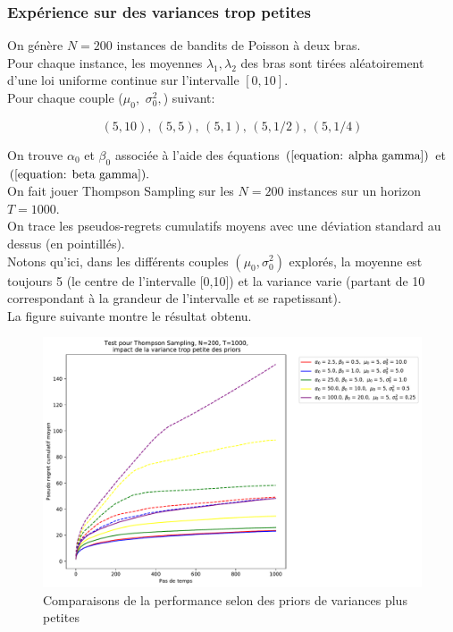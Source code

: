 \documentclass[letterpaper,11pt]{article}
\begin{document}
\subsubsection*{Expérience sur des variances trop petites}

On génère $N=200$ instances de bandits de Poisson à deux bras.\\
Pour chaque instance, les moyennes $\lambda_1, \lambda_2$ des bras sont tirées aléatoirement d'une loi uniforme continue sur l'intervalle $[0,10]$.\\

Pour chaque couple ($\mu_0,$ $\sigma^2_0,$) suivant:

$$(5,10),\,(5,5),\,(5,1),\,(5,1/2),\,(5,1/4)$$

On trouve $\alpha_0$ et $\beta_0$ associée à l'aide des équations $(\ref{equation: alpha gamma})$ et $(\ref{equation: beta gamma}).$
\\

On fait jouer Thompson Sampling sur les $N=200$ instances sur un horizon $T=1000.$\\
 
On trace les pseudos-regrets cumulatifs moyens avec une déviation standard au dessus (en pointillés).\\

Notons qu'ici, dans les différents couples $(\mu_0,\sigma^2_0)$ explorés, la moyenne est toujours 5 (le centre de l'intervalle [0,10]) et la variance varie (partant de 10 correspondant à la grandeur de l'intervalle et se rapetissant).\\

La figure suivante montre le résultat obtenu.

\begin{figure}[H]
\label{figure: variance petite}
\caption{Comparaisons de la performance selon des priors de variances plus petites}
\begin{center}
\includegraphics[scale=0.5]{variance_trop_petites_N=200.pdf} 
\end{center}
\end{figure}
\end{document}
